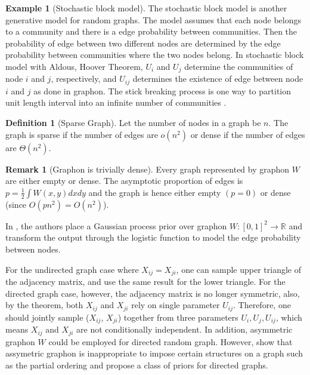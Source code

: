 \documentclass{article}
\theoremstyle{definition}
\newtheorem{definition}{Definition}
\newtheorem{example}{Example}[definition]
\newtheorem{remark}{Remark}
\begin{document}
\begin{example}[Stochastic block model] The stochastic block model is another generative model for random graphs. The model assumes that each node belongs to a community and there is a edge probability between communities. Then the probability of edge between two different nodes are determined by the edge probability between communities where the two nodes belong. In stochastic block model with Aldous, Hoover Theorem, $U_i$ and $U_j$ determine the communities of node $i$ and $j$, respectively, and $U_{ij}$ determines the existence of edge between node $i$ and $j$ as done in graphon. The stick breaking process is one way to partition unit length interval into an infinite number of communities \cite{sethuraman1994constructive}.
\end{example}

\begin{definition}[Sparse Graph]
Let the number of nodes in a graph be $n$. The graph is sparse if the number of edges are $o(n^2)$ or dense if the number of edges are $\Theta(n^2)$.
\end{definition}

\begin{remark}[Graphon is trivially dense]
Every graph represented by graphon $W$ are either empty or dense. The asymptotic proportion of edges is $p = \frac{1}{2}\int W(x, y) dxdy$ and the graph is hence either empty $(p=0)$ or dense (since $O(pn^2) = O(n^2)$).
\end{remark}

In \cite{Lloyd2013}, the authors place a Gaussian process prior over graphon $W:[0,1]^2 \rightarrow \mathbb{R}$ and transform the output through the logistic function to model the edge probability between nodes.

For the undirected graph case where $X_{ij} = X_{ji}$, one can sample upper triangle of the adjacency matrix, and use the same result for the lower triangle. For the directed graph case, however, the adjacency matrix is no longer symmetric, also, by the theorem, both $X_{ij}$ and $X_{ji}$ rely on single parameter $U_{ij}$. Therefore, one should jointly sample ($X_{ij}$, $X_{ji}$) together from three parameters $U_{i}, U_{j}, U_{ij}$, which means $X_{ij}$ and $X_{ji}$ are not conditionally independent. In addition, asymmetric graphon $W$ could be employed for directed random graph. However, \cite{Cai2015} show that assymetric graphon is inappropriate to impose certain structures on a graph such as the partial ordering and propose a class of priors for directed graphs.
\end{document}
